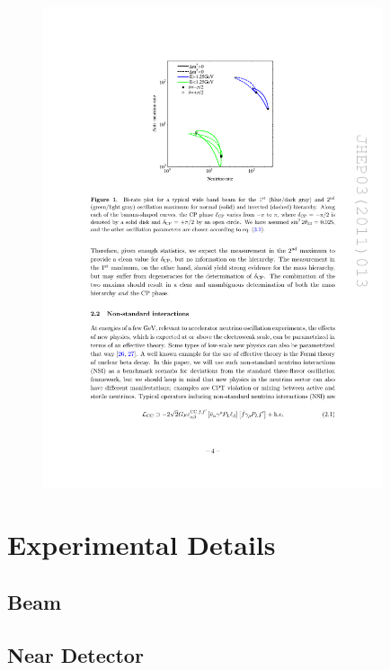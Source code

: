 \begin{figure}
  \centering
  \includegraphics[width=10cm]{TwoPeakAmbiguity.pdf}
  \caption{}
  \label{fig:TwoPeakAmbiguity}
\end{figure}

\section{Experimental Details}\label{sec:DUNEExperiment}

\subsection{Beam}\label{sec:DUNEBeam}

\subsection{Near Detector}\label{sec:NearDetector}

